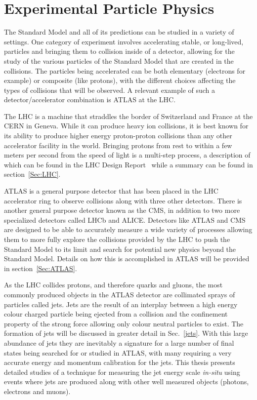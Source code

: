 \section{Experimental Particle Physics}
\label{Sec:Experi}
The Standard Model and all of its predictions can be studied in a variety of settings.  
One category of experiment involves accelerating stable, or long-lived, particles and bringing them to collision inside of a detector, allowing for the study of the various particles of the Standard Model that are created in the collisions.  
The particles being accelerated can be both elementary (electrons for example) or composite (like protons), with the different choices affecting the types of collisions that will be observed.  
A relevant example of such a detector/accelerator combination is \gls{ATLAS} at the \gls{LHC}.  

The \gls{LHC} is a machine that straddles the border of Switzerland and France at the \gls{CERN} in Geneva.  
While it can produce heavy ion collisions, it is best known for its ability to produce higher energy proton-proton collisions than any other accelerator facility in the world.   
Bringing protons from rest to within a few meters per second from the speed of light is a multi-step process, a description of which can be found in the LHC Design Report~\cite{LHCDesignReport} while a summary can be found in section~\ref{Sec:LHC}.  

\gls{ATLAS} is a general purpose detector that has been placed in the LHC accelerator ring to observe collisions along with three other detectors.  
There is another general purpose detector known as the \gls{CMS}, in addition to two more specialized detectors called \gls{LHCb} and \gls{ALICE}.  
Detectors like \gls{ATLAS} and \gls{CMS} are designed to be able to accurately measure a wide variety of processes allowing them to more fully explore the collisions provided by the \gls{LHC} to push the Standard Model to its limit and search for potential new physics beyond the Standard Model.  
Details on how this is accomplished in ATLAS will be provided in section~\ref{Sec:ATLAS}.  

As the \gls{LHC} collides protons, and therefore quarks and gluons, the most commonly produced objects in the \gls{ATLAS} detector are collimated sprays of particles called jets.  
Jets are the result of an interplay between a high energy colour charged particle being ejected from a collision and the confinement property of the strong force allowing only colour neutral particles to exist.  
The formation of jets will be discussed in greater detail in Sec.~\ref{jets}.  
With this large abundance of jets they are inevitably a signature for a large number of final states being searched for or studied in ATLAS, with many requiring a very accurate energy and momentum calibration for the jets.  
This thesis presents detailed studies of a technique for measuring the jet energy scale \textit{in-situ} using events where jets are produced along with other well measured objects (photons, electrons and muons).  

